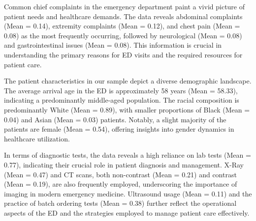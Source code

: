 \documentclass[,,nonblindrev]{informs}
\begin{document}
Common chief complaints in the emergency department paint a vivid
picture of patient needs and healthcare demands. The data reveals
abdominal complaints (Mean = 0.14), extremity complaints (Mean = 0.12),
and chest pain (Mean = 0.08) as the most frequently occurring, followed
by neurological (Mean = 0.08) and gastrointestinal issues (Mean = 0.08).
This information is crucial in understanding the primary reasons for ED
visits and the required resources for patient care.

The patient characteristics in our sample depict a diverse demographic
landscape. The average arrival age in the ED is approximately 58 years
(Mean = 58.33), indicating a predominantly middle-aged population. The
racial composition is predominantly White (Mean = 0.89), with smaller
proportions of Black (Mean = 0.04) and Asian (Mean = 0.03) patients.
Notably, a slight majority of the patients are female (Mean = 0.54),
offering insights into gender dynamics in healthcare utilization.

In terms of diagnostic tests, the data reveals a high reliance on lab
tests (Mean = 0.77), indicating their crucial role in patient diagnosis
and management. X-Ray (Mean = 0.47) and CT scans, both non-contrast
(Mean = 0.21) and contrast (Mean = 0.19), are also frequently employed,
underscoring the importance of imaging in modern emergency medicine.
Ultrasound usage (Mean = 0.11) and the practice of batch ordering tests
(Mean = 0.38) further reflect the operational aspects of the ED and the
strategies employed to manage patient care effectively.
\end{document}
